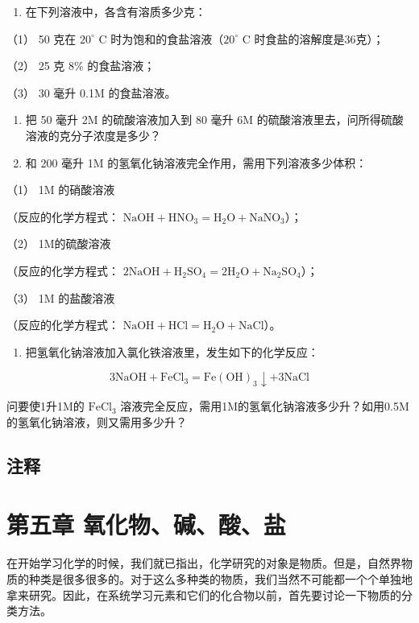 \begin{enumerate}[start=9]
\item
  在下列溶液中，各含有溶质多少克：
\end{enumerate}

（1） 50 克在 \(20^{\circ}\) C 时为饱和的食盐溶液（\(20^{\circ}\) C
时食盐的溶解度是36克）；

（2） 25 克 8\% 的食盐溶液；

（3） 30 毫升 0.1M 的食盐溶液。

\begin{enumerate}[start=10]
\item
  把 50 毫升 2M 的硫酸溶液加入到 80 毫升 6M
  的硫酸溶液里去，问所得硫酸溶液的克分子浓度是多少？
\item
  和 200 毫升 1M 的氢氧化钠溶液完全作用，需用下列溶液多少体积：
\end{enumerate}

（1） 1M 的硝酸溶液

（反应的化学方程式：
\(\mathrm{NaOH} + \mathrm{HNO}_3 = \mathrm{H}_2\mathrm{O} + \mathrm{NaNO}_3\)）；

（2） 1M的硫酸溶液

（反应的化学方程式：
\(2\mathrm{NaOH} + \mathrm{H}_{2}\mathrm{SO}_{4} = 2\mathrm{H}_{2}\mathrm{O} + \mathrm{Na}_{2}\mathrm{SO}_{4}\)）；

（3） 1M 的盐酸溶液

（反应的化学方程式：
\(\mathrm{NaOH} + \mathrm{HCl} = \mathrm{H}_2\mathrm{O} + \mathrm{NaCl}\)）。

\begin{enumerate}[start=12]
\item
  把氢氧化钠溶液加入氯化铁溶液里，发生如下的化学反应：
\end{enumerate}

\[
3 \mathrm{NaOH} + \mathrm{FeCl}_{3} = \mathrm{Fe(OH)}_{3} \downarrow + 3 \mathrm{NaCl}
\]

问要使1升1M的 \(\mathrm{FeCl}_3\)
溶液完全反应，需用1M的氢氧化钠溶液多少升？如用0.5M的氢氧化钠溶液，则又需用多少升？

\section{注释}

\chapter{第五章 氧化物、碱、酸、盐}

在开始学习化学的时候，我们就已指出，化学研究的对象是物质。但是，自然界物质的种类是很多很多的。对于这么多种类的物质，我们当然不可能都一个个单独地拿来研究。因此，在系统学习元素和它们的化合物以前，首先要讨论一下物质的分类方法。

